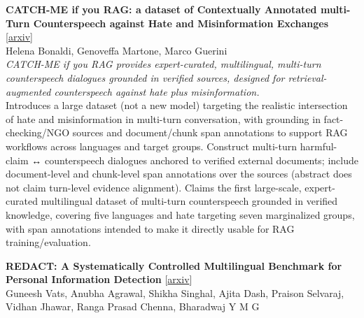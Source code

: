 \documentclass[12pt,letterpaper]{article}
\begin{document}
\medskip

{\small\textbf{CATCH-ME if you RAG: a dataset of Contextually Annotated multi-Turn Counterspeech against Hate and Misinformation Exchanges}} {\scriptsize[\href{https://arxiv.org/abs/2606.20369}{arxiv}]}\\
{\scriptsize Helena Bonaldi, Genoveffa Martone, Marco Guerini}\\

{\small\textit{CATCH-ME if you RAG provides expert-curated, multilingual, multi-turn counterspeech dialogues grounded in verified sources, designed for retrieval-augmented counterspeech against hate plus misinformation.}}\\[1pt]
{\footnotesize Introduces a large dataset (not a new model) targeting the realistic intersection of hate and misinformation in multi-turn conversation, with grounding in fact-checking/NGO sources and document/chunk span annotations to support RAG workflows across languages and target groups. Construct multi-turn harmful-claim ↔ counterspeech dialogues anchored to verified external documents; include document-level and chunk-level span annotations over the sources (abstract does not claim turn-level evidence alignment). Claims the first large-scale, expert-curated multilingual dataset of multi-turn counterspeech grounded in verified knowledge, covering five languages and hate targeting seven marginalized groups, with span annotations intended to make it directly usable for RAG training/evaluation.}

\medskip

{\small\textbf{REDACT: A Systematically Controlled Multilingual Benchmark for Personal Information Detection}} {\scriptsize[\href{https://arxiv.org/abs/2606.19881}{arxiv}]}\\
{\scriptsize Guneesh Vats, Anubha Agrawal, Shikha Singhal, Ajita Dash, Praison Selvaraj, Vidhan Jhawar, Ranga Prasad Chenna, Bharadwaj Y M G}\\
\end{document}
